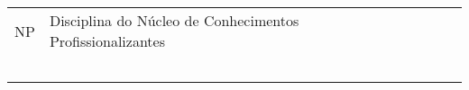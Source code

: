 \begin{table}[tbp]
{\begin{tabular}{llllllllll}
			\multicolumn{1}{|l|}{NP}                        & \multicolumn{1}{l|}{Disciplina do Núcleo de Conhecimentos Profissionalizantes}            &                                             & \textbf{}                                                                         & \textbf{}                             &                         &                         &                                       &                                    &  \\ \cline{1-2}
			&                                                                                           &                                             &                                                                                   &                                       &                         &                         &                                       &                                    &  \\
			&                                                                                           &                                             &                                                                                   &                                       &                         &                         &                                       &                                    &  \\
			&                                                                                           &                                             &                                                                                   &                                       &                         &                         &                                       &                                    &  \\
			&                                                                                           &                                             &                                                                                   &                                       &                         &                         &                                       &                                    &  \\
			& {\color[HTML]{009901} }                                                                   & {\color[HTML]{009901} }                     & {\color[HTML]{009901} }                                                           & {\color[HTML]{009901} }               & {\color[HTML]{009901} } & {\color[HTML]{009901} } & {\color[HTML]{009901} }               & {\color[HTML]{009901} }            &  \\

\end{tabular}}
\end{table}
